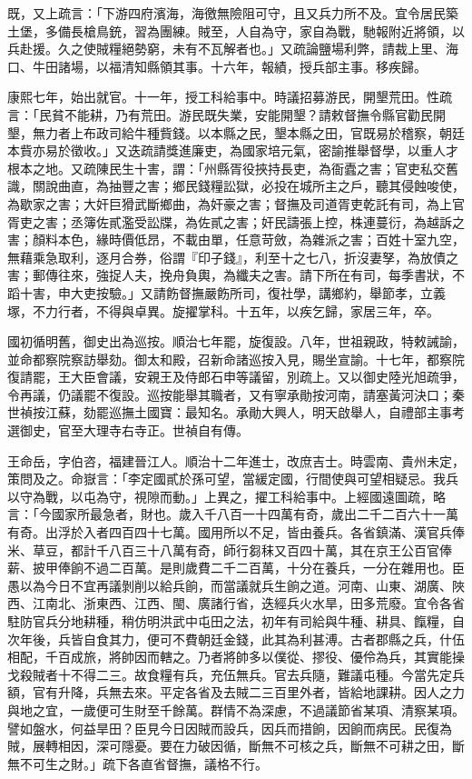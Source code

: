 \begin{pinyinscope}
既，又上疏言：「下游四府濱海，海徼無險阻可守，且又兵力所不及。宜令居民築土堡，多備長槍鳥銃，習為團練。賊至，人自為守，家自為戰，馳報附近將領，以兵赴援。久之使賊糧絕勢窮，未有不瓦解者也。」又疏論鹽場利弊，請裁上里、海口、牛田諸場，以福清知縣領其事。十六年，報績，授兵部主事。移疾歸。

康熙七年，始出就官。十一年，授工科給事中。時議招募游民，開墾荒田。性疏言：「民貧不能耕，乃有荒田。游民既失業，安能開墾？請敕督撫令縣官勸民開墾，無力者上布政司給牛種貲錢。以本縣之民，墾本縣之田，官既易於稽察，朝廷本貲亦易於徵收。」又迭疏請獎進廉吏，為國家培元氣，密諭推舉督學，以重人才根本之地。又疏陳民生十害，謂：「州縣胥役挾持長吏，為衙蠹之害；官吏私交舊識，關說曲直，為抽豐之害；鄉民錢糧訟獄，必投在城所主之戶，聽其侵蝕唆使，為歇家之害；大奸巨猾武斷鄉曲，為奸豪之害；督撫及司道胥吏乾託有司，為上官胥吏之害；丞簿佐貳濫受訟牒，為佐貳之害；奸民譸張上控，株連蔓衍，為越訴之害；顏料本色，緣時價低昂，不載由單，任意苛斂，為雜派之害；百姓十室九空，無藉乘急取利，逐月合券，俗謂『印子錢』，利至十之七八，折沒妻孥，為放債之害；郵傳往來，強捉人夫，挽舟負輿，為纖夫之害。請下所在有司，每季書狀，不蹈十害，申大吏按驗。」又請飭督撫嚴飭所司，復社學，講鄉約，舉節孝，立義塚，不力行者，不得與卓異。旋擢掌科。十五年，以疾乞歸，家居三年，卒。

國初循明舊，御史出為巡按。順治七年罷，旋復設。八年，世祖親政，特敕誡諭，並命都察院察訪舉劾。御太和殿，召新命諸巡按入見，賜坐宣諭。十七年，都察院復請罷，王大臣會議，安親王及侍郎石申等議留，別疏上。又以御史陸光旭疏爭，令再議，仍議罷不復設。巡按能舉其職者，又有寧承勛按河南，請塞黃河決口；秦世禎按江蘇，劾罷巡撫土國寶：最知名。承勛大興人，明天啟舉人，自禮部主事考選御史，官至大理寺右寺正。世禎自有傳。

王命岳，字伯咨，福建晉江人。順治十二年進士，改庶吉士。時雲南、貴州未定，策問及之。命嶽言：「李定國貳於孫可望，當緩定國，行間使與可望相疑忌。我兵以守為戰，以屯為守，視隙而動。」上異之，擢工科給事中。上經國遠圖疏，略言：「今國家所最急者，財也。歲入千八百一十四萬有奇，歲出二千二百六十一萬有奇。出浮於入者四百四十七萬。國用所以不足，皆由養兵。各省鎮滿、漢官兵俸米、草豆，都計千八百三十八萬有奇，師行芻秣又百四十萬，其在京王公百官俸薪、披甲俸餉不過二百萬。是則歲費二千二百萬，十分在養兵，一分在雜用也。臣愚以為今日不宜再議剝削以給兵餉，而當議就兵生餉之道。河南、山東、湖廣、陜西、江南北、浙東西、江西、閩、廣諸行省，迭經兵火水旱，田多荒廢。宜令各省駐防官兵分地耕種，稍仿明洪武中屯田之法，初年有司給與牛種、耕具、餼糧，自次年後，兵皆自食其力，便可不費朝廷金錢，此其為利甚溥。古者郡縣之兵，什伍相配，千百成旅，將帥因而轄之。乃者將帥多以僕從、摎役、優伶為兵，其實能操戈殺賊者十不得二三。故食糧有兵，充伍無兵。官去兵隨，難議屯種。今當先定兵額，官有升降，兵無去來。平定各省及去賊二三百里外者，皆給地課耕。因人之力與地之宜，一歲便可生財至千餘萬。群情不為深慮，不過議節省某項、清察某項。譬如盤水，何益旱田？臣見今日因賊而設兵，因兵而措餉，因餉而病民。民復為賊，展轉相因，深可隱憂。要在力破因循，斷無不可核之兵，斷無不可耕之田，斷無不可生之財。」疏下各直省督撫，議格不行。


\end{pinyinscope}
